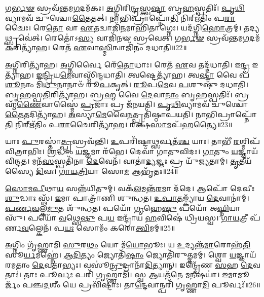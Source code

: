 𑌗\-\ul{𑌰𑍍𑌭}\-\-\ul{𑍟} 𑌸𑍍𑌰𑌵᳴𑌨𑍍𑌤𑌮\-\ul{𑌗}\-𑌦𑌮᳴𑌕𑌃।
\-\ul{𑌅}\-𑌗𑍍𑌨𑌿𑌰𑌿\-\ul{𑌨𑍍𑌦𑍍𑌰}\-𑌸𑍍𑌤𑍍𑌵\-\ul{𑌷𑍍𑌟𑌾} 𑌬𑍃\-\ul{𑌹}\-𑌸𑍍𑌪𑌤𑌿𑌃᳴।
\-\ul{𑌪𑍃}\-\-\ul{𑌥𑌿}\-𑌵𑍍𑌯𑌾𑌮𑌵᳴ 𑌚𑍁𑌶𑍍𑌚𑍋\-\ul{𑌤𑍈}\-𑌤𑌤𑍍।
𑌨𑌾𑌭𑌿𑌪𑍍𑌰𑌾𑌪𑍍𑌨𑍋᳴\-\ul{𑌤𑌿} 𑌨𑌿𑌰𑍍‌\mbox{}𑌋᳴𑌤𑌿𑌂 𑌪\-\ul{𑌰𑌾}\-𑌚𑍈𑌃।
𑌰𑍇\-\ul{𑌤𑍋} 𑌵𑌾 \ul{𑌏}\-𑌤𑌦𑍍𑌵𑌾𑌜𑌿᳴\-\ul{𑌨}\-𑌮𑌾𑌹𑌿᳴𑌤𑌾𑌗𑍍𑌨𑍇𑌃।
𑌯𑌦᳴𑌗𑍍𑌨𑌿\-\ul{𑌹𑍋}\-𑌤𑍍𑌰𑌮𑍍।
𑌤𑌦𑍍𑌯𑌥𑍍𑌸𑍍𑌰𑌵𑍇॑𑌤𑍍।
𑌰𑍇𑌤𑍋॑\-𑌽\-\ul{𑌸𑍍𑌯} 𑌵𑌾𑌜𑌿᳴𑌨𑍟 𑌸𑍍𑌰𑌵𑍇𑌤𑍍।
𑌗\-\ul{𑌰𑍍𑌭}\-\-\ul{𑍟} 𑌸𑍍𑌰𑌵᳴𑌨𑍍𑌤𑌮\-\ul{𑌗}\-𑌦𑌮᳴\-\ul{𑌕}\-𑌰𑌿𑌤𑍍𑌯𑌾᳴𑌹।
𑌰𑍇𑌤᳴ \ul{𑌏}\-𑌵𑌾\-\ul{𑌸𑍍𑌮𑌿}\-𑌨𑍍𑌵𑌾𑌜𑌿᳴𑌨𑌂 𑌦𑌧𑌾𑌤𑌿॥22॥

\-\ul{𑌅}\-𑌗𑍍𑌨𑌿𑌰𑌿𑌤𑍍𑌯𑌾᳴𑌹।
\-\ul{𑌅}\-𑌗𑍍𑌨𑌿𑌰𑍍𑌵𑍈 𑌰𑍇᳴\-\ul{𑌤𑍋}\-𑌧𑌾𑌃।
𑌰𑍇𑌤᳴ \ul{𑌏}\-𑌵 𑌤𑌦𑍍𑌦᳴𑌧𑌾𑌤𑌿।
𑌇\-\ul{𑌨𑍍𑌦𑍍𑌰} 𑌇𑌤𑍍𑌯𑌾᳴𑌹।
\-\ul{𑌇}\-\-\ul{𑌨𑍍𑌦𑍍𑌰𑌿}\-𑌯\-\ul{𑌮𑍇}\-𑌵𑌾𑌸𑍍𑌮𑌿᳴𑌨𑍍𑌦𑌧𑌾𑌤𑌿।
𑌤𑍍𑌵𑌷𑍍𑌟𑍇𑌤𑍍𑌯𑌾᳴𑌹।
𑌤𑍍𑌵\-\ul{𑌷𑍍𑌟𑌾} 𑌵𑍈 𑌪᳴\-\ul{𑌶𑍂}\-𑌨𑌾𑌂 𑌮𑌿᳴\-\ul{𑌥𑍁}\-𑌨𑌾𑌨𑌾𑍞᳴ 𑌰𑍂\-\ul{𑌪}\-𑌕𑍃𑌤𑍍।
\-\ul{𑌰𑍂}\-𑌪\-\ul{𑌮𑍇}\-𑌵 \ul{𑌪}\-𑌶𑍁𑌷𑍁᳴ 𑌦𑌧𑌾𑌤𑌿।
𑌬𑍃\-\ul{𑌹}\-𑌸𑍍𑌪\-\ul{𑌤𑌿}\-𑌰𑌿𑌤𑍍𑌯𑌾᳴𑌹।
𑌬𑍍𑌰\-\ul{𑌹𑍍𑌮} 𑌵𑍈 \ul{𑌦𑍇}\-𑌵𑌾\-\ul{𑌨𑌾𑌂} 𑌬𑍃\-\ul{𑌹}\-𑌸𑍍𑌪𑌤𑌿𑌃᳴।
𑌬𑍍𑌰𑌹𑍍𑌮᳴\-\ul{𑌣𑍈}\-𑌵𑌾𑌸𑍍𑌮𑍈॑ \ul{𑌪𑍍𑌰}\-𑌜𑌾𑌃 𑌪𑍍𑌰 𑌜᳴𑌨𑌯𑌤𑌿।
\-\ul{𑌪𑍃}\-\-\ul{𑌥𑌿}\-𑌵𑍍𑌯𑌾𑌮𑌵᳴ 𑌚𑍁𑌶𑍍𑌚𑍋\-\ul{𑌤𑍈}\-𑌤𑌦𑌿𑌤𑍍𑌯𑌾᳴𑌹।
\-\ul{𑌅}\-𑌸𑍍𑌯𑌾\-\ul{𑌮𑍇}\-𑌵𑍈\-\ul{𑌨}\-𑌤𑍍𑌪𑍍𑌰𑌤𑌿᳴\-𑌷𑍍𑌠𑌾𑌪𑌯𑌤𑌿।
𑌨𑌾𑌭𑌿𑌪𑍍𑌰𑌾𑌪𑍍𑌨𑍋᳴\-\ul{𑌤𑌿} 𑌨𑌿𑌰𑍍‌\mbox{}𑌋᳴𑌤𑌿𑌂 𑌪\-\ul{𑌰𑌾}\-𑌚𑍈𑌰𑌿𑌤𑍍𑌯𑌾᳴𑌹।
𑌰𑌕𑍍𑌷᳴\-\ul{𑌸𑌾}\-𑌮𑌪᳴𑌹𑌤𑍍𑌯𑍈॥23॥

𑌯𑌾𑌃 \ul{𑌪𑍁}\-𑌰𑌸𑍍𑌤𑌾॑\-\ul{𑌤𑍍𑌪𑍍𑌰}\-𑌸𑍍𑌰𑌵᳴𑌨𑍍𑌤𑌿।
\-\ul{𑌉}\-𑌪𑌰𑌿᳴𑌷𑍍𑌟𑌾\-\ul{𑌥𑍍𑌸}\-𑌰𑍍𑌵𑌤᳴\-\ul{𑌶𑍍𑌚} 𑌯𑌾𑌃।
𑌤𑌾𑌭𑍀᳴ \ul{𑌰}\-𑌶𑍍𑌮𑌿𑌪᳴𑌵𑌿𑌤𑍍𑌰𑌾𑌭𑌿𑌃।
\-\ul{𑌶𑍍𑌰}\-𑌦𑍍𑌧𑌾𑌂 \ul{𑌯}\-𑌜𑍍𑌞𑌮𑌾 𑌰᳴𑌭𑍇।
𑌦𑍇𑌵𑌾᳴ 𑌗𑌾𑌤𑍁𑌵𑌿𑌦𑌃।
\-\ul{𑌗𑌾}\-𑌤𑍁𑌂 \ul{𑌯}\-𑌜𑍍𑌞𑌾𑌯᳴ 𑌵𑌿𑌨𑍍𑌦𑌤।
𑌮𑌨᳴\-\ul{𑌸}\-𑌸𑍍𑌪𑌤𑌿᳴𑌨𑌾 \ul{𑌦𑍇}\-𑌵𑍇𑌨᳴।
𑌵𑌾𑌤𑌾॑\-\ul{𑌦𑍍𑌯}\-𑌜𑍍𑌞𑌃 𑌪𑍍𑌰 𑌯𑍁᳴𑌜𑍍𑌯𑌤𑌾𑌮𑍍।
\-\ul{𑌤𑍃}\-𑌤𑍀𑌯᳴𑌸𑍍𑌯𑍈 \ul{𑌦𑌿}\-𑌵𑌃।
\-\ul{𑌗𑌾}\-\-\ul{𑌯}\-\-\ul{𑌤𑍍𑌰𑌿}\-𑌯𑌾 𑌸𑍋\-\ul{𑌮} 𑌆𑌭𑍃᳴𑌤𑌃॥24॥

\-\ul{𑌸𑍋}\-\-\ul{𑌮}\-\-\ul{𑌪𑍀}\-𑌥𑌾\-\ul{𑌯} 𑌸𑌨𑍍𑌨᳴𑌯𑌿𑌤𑍁𑌮𑍍।
𑌵𑌕᳴\-\ul{𑌲}\-𑌮𑌨𑍍𑌤᳴\-\ul{𑌰}\-𑌮𑌾 𑌦᳴𑌦𑍇।
𑌆𑌪𑍋᳴ 𑌦𑍇𑌵𑍀𑌃 \ul{𑌶𑍁}\-𑌦𑍍𑌧𑌾𑌃 𑌸𑍍𑌥᳴।
\-\ul{𑌇}\-𑌮𑌾 𑌪𑌾𑌤𑍍𑌰𑌾᳴𑌣𑌿 𑌶𑍁𑌨𑍍𑌧𑌤।
\-\ul{𑌉}\-\-\ul{𑌪𑌾}\-\-\ul{𑌤}\-𑌙𑍍𑌕𑍍𑌯𑌾᳴𑌯 \ul{𑌦𑍇}\-𑌵𑌾𑌨𑌾॑𑌮𑍍।
\-\ul{𑌪}\-\-\ul{𑌰𑍍𑌣}\-\-\ul{𑌵}\-𑌲𑍍𑌕\-\ul{𑌮𑍁}\-𑌤 𑌶𑍁᳴𑌨𑍍𑌧𑌤।
𑌪𑌯𑍋᳴ \ul{𑌗𑍃}\-𑌹𑍇\-\ul{𑌷𑍁} 𑌪𑌯𑍋᳴ 𑌅\-\ul{𑌘𑍍𑌨𑌿}\-𑌯𑌾𑌸𑍁᳴।
𑌪𑌯𑍋᳴ \ul{𑌵}\-𑌥𑍍𑌸𑍇\-\ul{𑌷𑍁} 𑌪\-\ul{𑌯} 𑌇𑌨𑍍𑌦𑍍𑌰𑌾᳴𑌯 \ul{𑌹}\-𑌵𑌿𑌷𑍇॑ 𑌧𑍍𑌰𑌿𑌯𑌸𑍍𑌵।
\-\ul{𑌗𑌾}\-\-\ul{𑌯}\-𑌤𑍍𑌰𑍀 𑌪᳴𑌰𑍍𑌣\-\ul{𑌵}\-𑌲𑍍𑌕𑍇𑌨᳴।
𑌪\-\ul{𑌯𑌃} 𑌸𑍋𑌮𑌂᳴ 𑌕𑌰𑍋\-\ul{𑌤𑍍𑌵𑌿}\-𑌮𑌮𑍍॥25॥

\-\ul{𑌅}\-𑌗𑍍𑌨𑌿𑌂 𑌗𑍃᳴𑌹𑍍𑌣𑌾𑌮𑌿 \ul{𑌸𑍁}\-𑌰\-\ul{𑌥𑌂} 𑌯𑍋 𑌮᳴\-\ul{𑌯𑍋}\-𑌭𑍂𑌃।
𑌯 \ul{𑌉}\-𑌦𑍍𑌯𑌨𑍍𑌤᳴\-\ul{𑌮𑌾}\-𑌰𑍋𑌹᳴\-\ul{𑌤𑌿} 𑌸𑍂\-\ul{𑌰𑍍𑌯}\-𑌮𑌹𑍍𑌨𑍇॑।
\-\ul{𑌆}\-\-\ul{𑌦𑌿}\-𑌤𑍍𑌯𑌂 𑌜𑍍𑌯𑍋𑌤𑌿᳴\-\ul{𑌷𑌾𑌂} 𑌜𑍍𑌯𑍋𑌤𑌿᳴𑌰𑍁\-\ul{𑌤𑍍𑌤}\-𑌮𑌮𑍍।
𑌶𑍍𑌵𑍋 \ul{𑌯}\-𑌜𑍍𑌞𑌾𑌯᳴ 𑌰𑌮𑌤𑌾𑌂 \ul{𑌦𑍇}\-𑌵𑌤𑌾॑𑌭𑍍𑌯𑌃।
𑌵𑌸𑍂॑\-\ul{𑌨𑍍𑌰𑍁}\-𑌦𑍍𑌰𑌾𑌨𑌾᳴\-\ul{𑌦𑌿}\-𑌤𑍍𑌯𑌾𑌨𑍍।
𑌇𑌨𑍍𑌦𑍍𑌰𑍇᳴𑌣 \ul{𑌸}\-𑌹 \ul{𑌦𑍇}\-𑌵𑌤𑌾𑌃॑।
𑌤𑌾𑌃 𑌪𑍂\-\ul{𑌰𑍍𑌵𑌃} 𑌪𑌰𑌿᳴ 𑌗𑍃𑌹𑍍𑌣𑌾𑌮𑌿।
𑌸𑍍𑌵 \ul{𑌆}\-𑌯𑌤᳴𑌨𑍇 𑌮\-\ul{𑌨𑍀}\-𑌷𑌯𑌾॑।
\-\ul{𑌇}\-𑌮𑌾𑌮𑍂𑌰𑍍𑌜𑌂᳴ 𑌪𑌞𑍍𑌚\-\ul{𑌦}\-𑌶𑍀𑌂 𑌯𑍇 𑌪𑍍𑌰𑌵𑌿᳴𑌷𑍍𑌟𑌾𑌃।
𑌤𑌾\-\ul{𑌨𑍍𑌦𑍇}\-𑌵𑌾𑌨𑍍𑌪𑌰𑌿᳴ 𑌗𑍃𑌹𑍍𑌣𑌾\-\ul{𑌮𑌿} 𑌪𑍂𑌰𑍍𑌵𑌃᳴॥26॥


